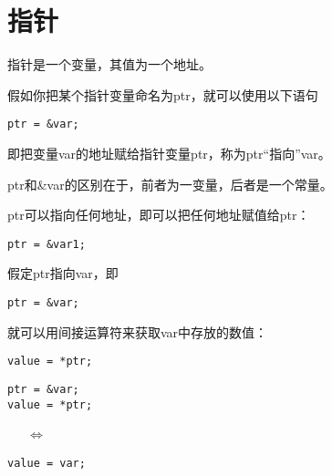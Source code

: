 \section{指针}
\begin{frame}[fragile]\ft{\secname}
指针是一个变量，其值为一个地址。
\end{frame}

\begin{frame}[fragile]\ft{\secname}
假如你把某个指针变量命名为{\tf ptr}，就可以使用以下语句
\begin{lstlisting}[backgroundcolor=\color{blue!10}]
ptr = &var;
\end{lstlisting}
即把变量{\tf var}的地址赋给指针变量{\tf ptr}，称为\textcolor{acolor1}{\tf ptr“指向”var}。
\pause \vspace{0.1in}

{\tf ptr}和{\tf \&var}的区别在于，前者为一变量，后者是一个常量。
\end{frame}

\begin{frame}[fragile]\ft{\secname}
{\tf ptr}可以指向任何地址，即可以把任何地址赋值给{\tf ptr}：
\begin{lstlisting}[backgroundcolor=\color{blue!10}]
ptr = &var1;
\end{lstlisting}
\end{frame}


\begin{frame}[fragile]
假定{\tf ptr}指向{\tf var}，即
\begin{lstlisting}[backgroundcolor=\color{blue!10}]
ptr = &var;
\end{lstlisting}
就可以用间接运算符{\tf *}来获取{\tf var}中存放的数值：
\begin{lstlisting}[backgroundcolor=\color{blue!10}]
value = *ptr;
\end{lstlisting}
\pause \vspace{0.1in}

\begin{minipage}{0.4\textwidth}
\begin{lstlisting}[backgroundcolor=\color{blue!10}]
ptr = &var;
value = *ptr;
\end{lstlisting}
\end{minipage}
~~~$\Longleftrightarrow$~~~
\begin{minipage}{0.4\textwidth}
\begin{lstlisting}[backgroundcolor=\color{blue!10}]
value = var;
\end{lstlisting}
\end{minipage}
\end{frame}

